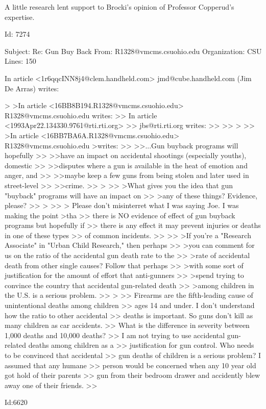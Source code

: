 \documentclass{article}
\begin{document}
A little research lent support to Brocki's opinion of Professor Copperud's
expertise.

\item
Id: 7274

Subject: Re: Gun Buy Back
From: R1328@vmcms.csuohio.edu
Organization: CSU
Lines: 150

In article <1r6qqcINN8j4@clem.handheld.com>
jmd@cube.handheld.com (Jim De Arras) writes:

>
>In article <16BB8B194.R1328@vmcms.csuohio.edu> R1328@vmcms.csuohio.edu writes:
>> In article <1993Apr22.134330.9761@rti.rti.org>
>> jbs@rti.rti.org writes:
>>
>> >
>> >In article <16BB7BA6A.R1328@vmcms.csuohio.edu> R1328@vmcms.csuohio.edu
>writes:
>> >>...Gun buyback programs will hopefully
>> >>have an impact on accidental shootings (especially youths), domestic
>> >>disputes where a gun is available in the heat of emotion and anger, and
>> >>maybe keep a few guns from being stolen and later used in street-level
>> >>crime.
>> >
>> >What gives you the idea that gun "buyback" programs will have an impact on
>> >any of these things?  Evidence, please?
>> >
>> > Please don't misinterret  what I was saying Joe.  I was making the point
>tha
>> there is NO evidence of effect of gun buyback programs but hopefully if
>> there is any effect it may prevent injuries or deaths in one of these types
>> of common incidents.
>>
>> >If you're a "Research Associate" in "Urban Child Research," then perhaps
>> >you can comment for us on the ratio of the accidental gun death rate to the
>> >rate of accidental death from other single causes?  Follow that perhaps
>> >with some sort of justification for the amount of effort that anti-gunners
>> >spend trying to convince the country that accidental gun-related death
>> >among children in the U.S. is a serious problem.
>> >
>>  Firearms are the fifth-leading cause of unintentional deaths among children
>> ages 14 and under.  I don't understand how the ratio to other accidental
>> deaths is important.  So guns don't kill as many children as car accidents.
>> What is the difference in severity between 1,000 deaths and 10,000 deaths?
>> I am not trying to use accidental gun-related deaths among children as a
>> justification for gun control.  Who needs to be convinced that accidental
>> gun deaths of children is a serious problem?  I assumed that any humane
>> person would be concerned when any 10 year old got hold of their parents
>> gun from their bedroom drawer and accidently blew away one of their friends.
>>

\item
Id:6620
\end{document}
